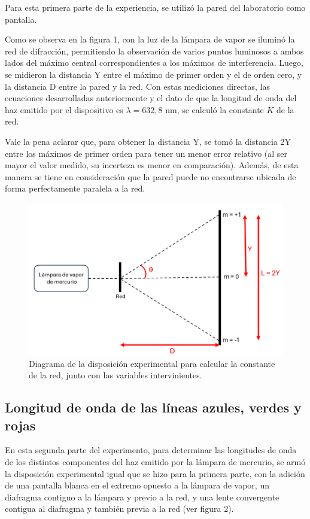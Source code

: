 \documentclass[12pt, a4paper]{article}
\begin{document}
Para esta primera parte de la experiencia, se utilizó la pared del laboratorio como pantalla.

Como se observa en la figura 1, con la luz de la lámpara de vapor se iluminó la red de difracción, permitiendo la observación de varios 
puntos luminosos a ambos lados del máximo central correspondientes a los máximos de interferencia. Luego, se midieron la distancia Y entre 
el máximo de primer orden y el de orden cero, y la distancia D entre la pared y la red. Con estas mediciones directas, las ecuaciones 
desarrolladas anteriormente y el dato de que la longitud de onda del haz emitido por el dispositivo es $\lambda = 632,8$ nm, se calculó 
la constante $K$ de la red.

Vale la pena aclarar que, para obtener la distancia Y, se tomó la distancia 2Y entre los máximos de primer orden para tener un menor error 
relativo (al ser mayor el valor medido, su incerteza es menor en comparación). Además, de esta manera se tiene en consideración que la 
pared puede no encontrarse ubicada de forma perfectamente paralela a la red.

\begin{figure}[!h] 
        \centering \includegraphics[width=0.9\columnwidth]{figures/diagramaExperimental1.png}
        \caption{\label{fig1}Diagrama de la disposición experimental para calcular la constante de la red, junto con las variables 
        intervinientes.}
\end{figure}

\subsection{Longitud de onda de las líneas azules, verdes y rojas}

En esta segunda parte del experimento, para determinar las longitudes de onda de los distintos componentes del haz emitido por la lámpara 
de mercurio, se armó la disposición experimental igual que se hizo para la primera parte, con la adición de una pantalla blanca en el 
extremo opuesto a la lámpara de vapor, un diafragma contiguo a la lámpara y previo a la red, y una lente convergente contigua al diafragma 
y también previa a la red (ver figura 2).
\end{document}
